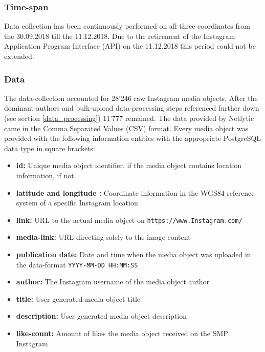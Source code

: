 \subsubsection{Time-span} \label{Instagram_timespan}
Data collection has been continuously performed on all three coordinates from the 30.09.2018 till the 11.12.2018. Due to the retirement of the Instagram Application Program Interface (API) on the 11.12.2018 \parencite{Instagram2018} this period could not be extended.

\subsubsection{Data} \label{Instagram_data}
The data-collection accounted for 28'246 raw Instagram media objects. After the dominant authors and bulk-upload data-processing steps referenced further down (see section \ref{data_processing}) 11'777 remained.
The data provided by Netlytic came in the Comma Separated Values (CSV) format. Every media object was provided with the following information entities with the appropriate PostgreSQL data type in square brackets:
\begin{itemize}[label={}]
    \item \textbf{id:} Unique media object identifier.  if the media object contains location information,  if not.
    \item \textbf{latitude and longitude
    :} Coordinate information in the WGS84 reference system of a specific Instagram location 
    \item \textbf{link:} URL to the actual media object on \texttt{https://www.Instagram.com/} 
    \item \textbf{media-link:} URL directing solely to the image content 
    \item \textbf{publication date:} Date and time when the media object was uploaded in the data-format \texttt{YYYY-MM-DD HH:MM:SS} 
    \item \textbf{author:} The Instagram username of the media object author 
    \item \textbf{title:} User generated media object title 
    \item \textbf{description:} User generated media object description 
    \item \textbf{like-count:} Amount of likes the media object received on the SMP Instagram 
\end{itemize}

